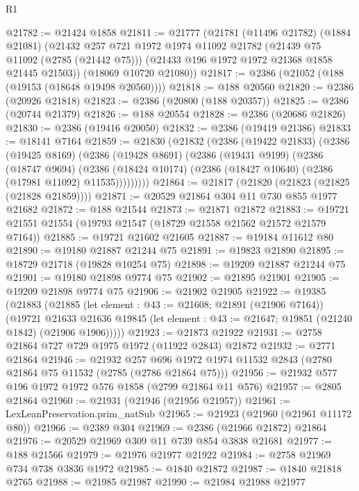 \begin{lexlean}{R1}
\begin{coremodule}
@21782 := @21424 @1858
@21811 := @21777
    (@21781
      (@11496 @21782)
      (@1884 @21081)
      (@21432
        @257
        @721
        @1972
        @1974
        @11092
        @21782
        (@21439 @75 @11092 (@2785 (@21442 @75)))
        (@21433 @196 @1972 @1972 @21368 @1858 @21445 @21503))
      (@18069 @10720 @21080))
@21817 := @2386 (@21052 (@188 (@19153 (@18648 @19498 @20560))))
@21818 := @188 @20560
@21820 := @2386 (@20926 @21818)
@21823 := @2386 (@20800 (@188 @20357))
@21825 := @2386 (@20744 @21379)
@21826 := @188 @20554
@21828 := @2386 (@20686 @21826)
@21830 := @2386 (@19416 @20050)
@21832 := @2386 (@19419 @21386)
@21833 := @18141 @7164
@21859 := @21830
    (@21832
      (@2386
        (@19422 @21833)
        (@2386
          (@19425 @8169)
          (@2386
            (@19428 @8691)
            (@2386
              (@19431 @9199)
              (@2386
                (@18747 @9694)
                (@2386 (@18424 @10174) (@2386 (@18427 @10640) (@2386 (@17981 @11092) @11535)))))))))
@21864 := @21817 (@21820 (@21823 (@21825 (@21828 @21859))))
@21871 := @20529 @21864 @304 @11 @730 @855 @1977 @21682
@21872 := @188 @21544
@21873 := @21871 @21872
@21883 := @19721 @21551 @21554 (@19793 @21547 (@18729 @21558 @21562 @21572 @21579 @7164))
@21885 := @19721 @21602 @21605
@21887 := @19184 @11612 @80
@21890 := @19180 @21887 @21244 @75
@21891 := @19823 @21890
@21895 := @18729 @21718 (@19828 @10254 @75)
@21898 := @19209 @21887 @21244 @75
@21901 := @19180 @21898 @9774 @75
@21902 := @21895 @21901
@21905 := @19209 @21898 @9774 @75
@21906 := @21902 @21905
@21922 := @19385
    (@21883
      (@21885
        (let element : @43 := @21608; @21891 (@21906 @7164))
        (@19721
          @21633
          @21636
          @19845
          (let element : @43 := @21647; @19851 (@21240 @1842) (@21906 @1906)))))
@21923 := @21873 @21922
@21931 := @2758 @21864 @727 @729 @1975 @1972 (@11922 @2843) @21872
@21932 := @2771 @21864
@21946 := @21932
    @257
    @696
    @1972
    @1974
    @11532
    @2843
    (@2780 @21864 @75 @11532 (@2785 (@2786 @21864 @75)))
@21956 := @21932 @577 @196 @1972 @1972 @576 @1858 (@2799 @21864 @11 @576)
@21957 := @2805 @21864
@21960 := @21931 (@21946 (@21956 @21957))
@21961 := LexLeanPreservation.prim_natSub
@21965 := @21923 (@21960 (@21961 @11172 @80))
@21966 := @2389 @304
@21969 := @2386 (@21966 @21872) @21864
@21976 := @20529 @21969 @309 @11 @739 @854 @3838 @21681
@21977 := @188 @21566
@21979 := @21976 @21977 @21922
@21984 := @2758 @21969 @734 @738 @3836 @1972
@21985 := @1840 @21872
@21987 := @1840 @21818 @2765
@21988 := @21985 @21987
@21990 := @21984 @21988 @21977

\end{coremodule}
\end{lexlean}
